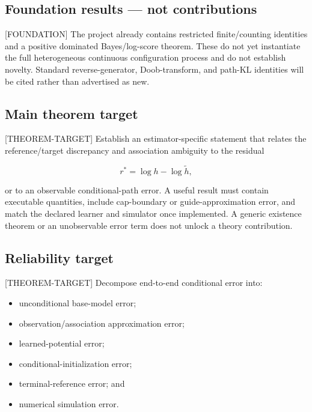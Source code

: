 \documentclass[11pt]{article}
\newcommand{\status}[1]{%
  \textcolor{statusred}{\textbf{\texttt{[#1]}}}%
}
\def\status#1{[#1]}%
\begin{document}
\subsection{Foundation results --- not contributions}
\label{sec:foundation-results-not-contributions}

\status{FOUNDATION} The project already contains restricted finite/\allowbreak{}counting identities and a positive dominated Bayes/\allowbreak{}log-score theorem. These do not yet instantiate the full heterogeneous continuous configuration process and do not establish novelty. Standard reverse-generator, Doob-transform, and path-KL identities will be cited rather than advertised as new.

\subsection{Main theorem target}
\label{sec:main-theorem-target}

\status{THEOREM-TARGET} Establish an estimator-specific statement that relates the reference/\allowbreak{}target discrepancy and association ambiguity to the residual

\[
r^*=\log h-\log\widetilde h,
\]

or to an observable conditional-path error. A useful result must contain executable quantities, include cap-boundary or guide-approximation error, and match the declared learner and simulator once implemented. A generic existence theorem or an unobservable error term does not unlock a theory contribution.

\subsection{Reliability target}
\label{sec:reliability-target}

\status{THEOREM-TARGET} Decompose end-to-end conditional error into:

\begin{itemize}
\item unconditional base-model error;
\item observation/\allowbreak{}association approximation error;
\item learned-potential error;
\item conditional-initialization error;
\item terminal-reference error; and
\item numerical simulation error.
\end{itemize}
\end{document}
